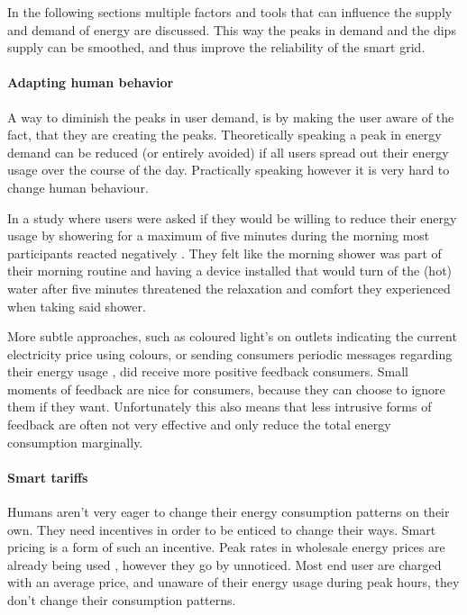 In the following sections multiple factors and tools that can influence the supply and demand of energy are discussed. This way the peaks in demand and the dips supply can be smoothed, and thus improve the reliability of the smart grid.

\paragraph{Adapting human behavior}

A way to diminish the peaks in user demand, is by making the user aware of the fact, that they are creating the peaks. Theoretically speaking a peak in energy demand can be reduced (or entirely avoided) if all users spread out their energy usage over the course of the day. Practically speaking however it is very hard to change human behaviour.

In a study where users were asked if they would be willing to reduce their energy usage by showering for a maximum of five minutes during the morning most participants reacted negatively \cite{GouldenBedwellRennick-EgglestoneEtAl2014}. They felt like the morning shower was part of their morning routine and having a device installed that would turn of the (hot) water after five minutes threatened the relaxation and comfort they experienced when taking said shower. 

More subtle approaches, such as coloured light's on outlets indicating the current electricity price using colours, or sending consumers periodic messages regarding their energy usage \cite{AyresRasemanShih2012}, did receive more positive feedback consumers. Small moments of feedback are nice for consumers, because they can choose to ignore them if they want. Unfortunately this also means that less intrusive forms of feedback are often not very effective and only reduce the total energy consumption marginally.

\paragraph{Smart tariffs}

Humans aren’t very eager to change their energy consumption patterns on their own. They need incentives in order to be enticed to change their ways. Smart pricing is a form of such an incentive. Peak rates in wholesale energy prices are already being used \cite{SamadiMohsenian-RadSchoberEtAl2012}, however they go by unnoticed. Most end user are charged with an average price, and unaware of their energy usage during peak hours, they don’t change their consumption patterns. 

